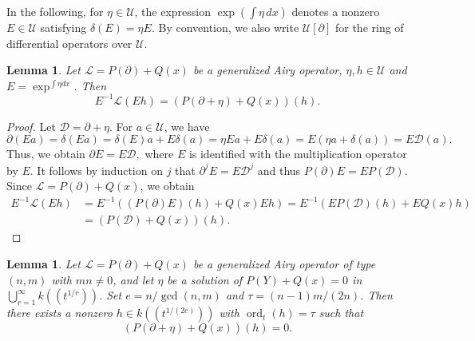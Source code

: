 \documentclass{article}
\newtheorem{lemma}[theorem]{Lemma}
\DeclareMathOperator{\ord}{ord}
\newcommand{\dd}{\delta}
\newcommand{\calD}{{\mathcal{D}}}
\newcommand{\calL}{{\mathcal{L}}}
\newcommand{\calU}{{\mathcal{U}}}
\begin{document}
In the following, for $\eta \in \calU$, the expression \(\exp\left(\int \eta\,dx\right)\) denotes a nonzero \(E\in \calU\) satisfying
$
  \dd(E)=\eta E.
$
By convention, we also write $\calU[\partial]$ for the ring of differential operators over $\calU$. 
\begin{lemma}
\label{LM:solution-reduced}
Let $\calL=P(\partial)+Q(x)$ be a generalized Airy operator, $\eta, h\in \calU$ and $E=\exp^{\int \eta dx}$.  Then
\[
  E^{-1}\calL(Eh)=(P(\partial+\eta)+Q(x))(h).
\]
\end{lemma}

\begin{proof}
 Let \(\calD=\partial+\eta\). For $a\in \calU$, we have 
\[
  \partial(Ea)=\dd(Ea)=\dd(E)a+E\dd(a)=\eta Ea+E\dd(a)=E(\eta a+\dd(a))=E\calD(a).
\]
Thus, we obtain
$
  \partial E = E \calD,
$
where $E$ is identified with the multiplication operator by $E$.
It follows by induction on \(j\) that
$
  \partial^jE=E \calD^j
$
and thus $P(\partial)E=EP(\calD)$.  Since $\calL=P(\partial)+Q(x)$, we obtain
\begin{align*}
  E^{-1}\calL(Eh)&=E^{-1}((P(\partial)E)(h)+Q(x)Eh)=E^{-1}(EP(\calD)(h)+EQ(x)h)\\
  &=(P(\calD)+Q(x))(h).
\end{align*}
\end{proof}

\begin{lemma}
\label{LM:transport_recursion}
Let $\calL=P(\partial)+Q(x)$ be a generalized Airy operator of type $(n,m)$ with $mn\neq 0$, 
and let $\eta$ be a solution of $P(Y)+Q(x)=0$ in $\bigcup_{r=1}^\infty k((t^{1/r}))$. Set $e=n/\gcd(n,m)$ and $\tau=(n-1)m/(2n)$. Then there exists a nonzero $h\in k((t^{1/(2e)}))$ with $\ord_t(h)=\tau$ such that 
$$
    (P(\partial + \eta) +Q(x))(h)=0.
$$
\end{lemma}
\end{document}
